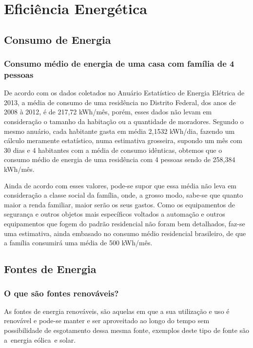 \section{Eficiência Energética}
\subsection{Consumo de Energia}
\subsubsection{Consumo médio de energia de uma casa com família de 4 pessoas}

	De acordo com os dados coletados no Anuário Estatístico de Energia Elétrica de 2013, a média de consumo de uma residência no Distrito Federal, dos anos de 2008 à 2012, é de 217,72 kWh/mês, porém, esses dados não levam em consideração o tamanho da habitação ou a quantidade de moradores. Segundo o mesmo anuário, cada habitante gasta em média 2,1532 kWh/dia, fazendo um cálculo meramente estatístico, numa estimativa grosseira, supondo um mês com 30 dias e 4 habitantes com a média de consumo idênticas, obtemos que o consumo médio de energia de uma residência com 4 pessoas sendo de 258,384 kWh/mês. 

	Ainda de acordo com esses valores, pode-se supor que essa média não leva em consideração a classe social da família, onde, a grosso modo, sabe-se que quanto maior a renda familiar, maior serão os seus gastos. Como os equipamentos de segurança e outros objetos mais específicos voltados a automação e outros equipamentos que fogem do padrão residencial não foram bem detalhados, faz-se uma estimativa, ainda embasado no consumo médio residencial brasileiro, de que a família consumirá uma média de 500 kWh/mês.\cite{epeanuario}


\subsection{Fontes de Energia}

\subsubsection{O que são fontes renováveis?}

	As fontes de energia renováveis, são aquelas em que a sua utilização e uso é renovável e pode-se manter e ser aproveitado ao longo do tempo sem possibilidade de esgotamento dessa mesma fonte, exemplos deste tipo de fonte são a energia eólica e solar.\cite{suapesquisaenergiarenovavel}

